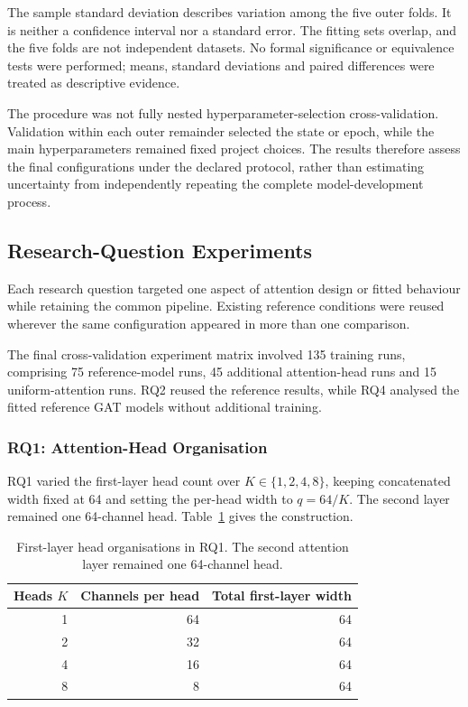 \documentclass[11pt,a4paper]{article}
\begin{document}
The sample standard deviation describes variation among the five outer folds. It is neither a confidence interval nor a standard error. The fitting sets overlap, and the five folds are not independent datasets. No formal significance or equivalence tests were performed; means, standard deviations and paired differences were treated as descriptive evidence.

The procedure was not fully nested hyperparameter-selection cross-validation. Validation within each outer remainder selected the state or epoch, while the main hyperparameters remained fixed project choices. The results therefore assess the final configurations under the declared protocol, rather than estimating uncertainty from independently repeating the complete model-development process.

\subsection{Research-Question Experiments}
\label{sec:experiments}

Each research question targeted one aspect of attention design or fitted behaviour while retaining the common pipeline. Existing reference conditions were reused wherever the same configuration appeared in more than one comparison.

The final cross-validation experiment matrix involved 135 training runs, comprising 75 reference-model runs, 45 additional attention-head runs and 15 uniform-attention runs. RQ2 reused the reference results, while RQ4 analysed the fitted reference GAT models without additional training.

\subsubsection{RQ1: Attention-Head Organisation}
\label{sec:rq1}

RQ1 varied the first-layer head count over \(K\in\{1,2,4,8\}\), keeping concatenated width fixed at 64 and setting the per-head width to \(q=64/K\). The second layer remained one 64-channel head. Table~\ref{tab:heads} gives the construction.

\begin{table}[!ht]
\centering
\caption{First-layer head organisations in RQ1. The second attention layer remained one 64-channel head.}
\label{tab:heads}
\begin{tabular}{@{}rrr@{}}
\toprule
Heads \(K\) & Channels per head & Total first-layer width\\
\midrule
1 & 64 & 64\\
2 & 32 & 64\\
4 & 16 & 64\\
8 & 8 & 64\\
\bottomrule
\end{tabular}
\end{table}
\end{document}

